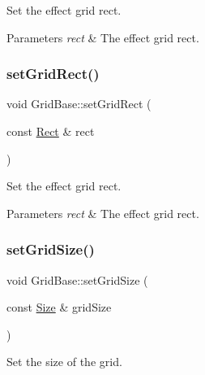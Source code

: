 Set the effect grid rect. 


\begin{DoxyParams}{Parameters}
{\em rect} & The effect grid rect. \\
\hline
\end{DoxyParams}
\mbox{\label{classGridBase_a078da34e2b566d89e4364ab19a37311d}} 
\subsubsection{\texorpdfstring{set\+Grid\+Rect()}{setGridRect()}\hspace{0.1cm}{\footnotesize\ttfamily [2/2]}}
{\footnotesize\ttfamily void Grid\+Base\+::set\+Grid\+Rect (\begin{DoxyParamCaption}\item[{const \hyperlink{classRect}{Rect} \&}]{rect }\end{DoxyParamCaption})}



Set the effect grid rect. 


\begin{DoxyParams}{Parameters}
{\em rect} & The effect grid rect. \\
\hline
\end{DoxyParams}
\mbox{\label{classGridBase_a1aaace91e60f9322a8782981dcab64b3}} 
\subsubsection{\texorpdfstring{set\+Grid\+Size()}{setGridSize()}\hspace{0.1cm}{\footnotesize\ttfamily [1/2]}}
{\footnotesize\ttfamily void Grid\+Base\+::set\+Grid\+Size (\begin{DoxyParamCaption}\item[{const \hyperlink{classSize}{Size} \&}]{grid\+Size }\end{DoxyParamCaption})\hspace{0.3cm}{\ttfamily [inline]}}

Set the size of the grid. \mbox{\label{classGridBase_a1aaace91e60f9322a8782981dcab64b3}} 

